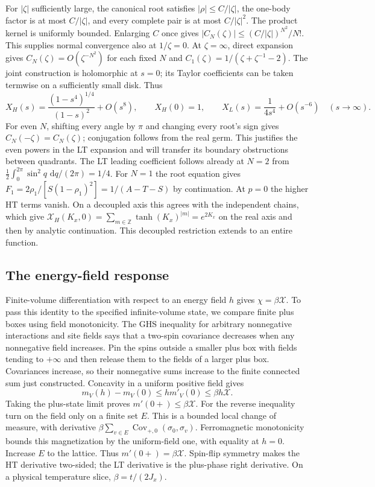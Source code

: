 \documentclass[11pt]{article}
\numberwithin{equation}{section}
\theoremstyle{definition}
\newcommand{\Z}{\mathbb Z}
\newcommand{\dd}{\,\mathrm d}
\begin{document}
For $|\zeta|$ sufficiently large, the canonical root satisfies
$|\rho|\le C/|\zeta|$, the one-body factor is at most
$C/|\zeta|$, and every complete pair is at most $C/|\zeta|^2$.
The product kernel is uniformly bounded. Enlarging $C$ once gives
$|C_N(\zeta)|\le (C/|\zeta|)^{N^2}/N!$.
This supplies normal convergence also at $1/\zeta=0$.
At $\zeta=\infty$, direct expansion gives
$C_N(\zeta)=O(\zeta^{-N^2})$ for each fixed $N$ and
$C_1(\zeta)=1/(\zeta+\zeta^{-1}-2)$.
The joint construction is holomorphic at $s=0$; its Taylor
coefficients can be taken termwise on a sufficiently small disk.
Thus
\[
 X_H(s)=\frac{(1-s^4)^{1/4}}{(1-s)^2}+O(s^8),\qquad
 X_H(0)=1,\qquad
 X_L(s)=\frac1{4s^4}+O(s^{-6})\quad(s\to\infty).
\]
For even $N$, shifting every angle by $\pi$ and changing every
root's sign gives $C_N(-\zeta)=C_N(\zeta)$; conjugation follows
from the real germ. This justifies the even powers in the LT
expansion and will transfer its boundary obstructions between
quadrants. The LT leading coefficient follows already at $N=2$ from
$\tfrac12\int_0^{2\pi}\sin^2q\,\dd q/(2\pi)=1/4$.
For $N=1$ the root equation gives
$F_1=2\rho_1/[S(1-\rho_1)^2]=1/(A-T-S)$ by continuation. At $p=0$ the higher HT
terms vanish. On a decoupled axis this agrees with the independent
chains, which give
$\mathcal X_H(K_x,0)=\sum_{m\in\Z}\tanh(K_x)^{|m|}
=e^{2K_x}$ on the real axis and then by analytic continuation.
This decoupled restriction extends to an entire function.

\subsection{The energy-field response}
Finite-volume differentiation with respect to an energy field $h$
gives $\chi=\beta\mathcal X$. To pass this identity to the
specified infinite-volume state, we compare finite plus boxes using
field monotonicity. The GHS inequality for arbitrary
nonnegative interactions and site fields \cite[Theorem 1.5]{CGN}
says that a two-spin covariance decreases when any nonnegative
field increases. Pin the spins outside a smaller plus box with
fields tending to $+\infty$ and then release them to the fields
of a larger plus box. Covariances increase, so their nonnegative
sums increase to the finite connected sum just constructed.
Concavity in a uniform positive field gives
\[
 m_V(h)-m_V(0)\le h m'_V(0)\le\beta h\mathcal X.
\]
Taking the plus-state limit proves $m'(0+)\le\beta\mathcal X$.
For the reverse inequality turn on the field only on a finite set
$E$. This is a bounded local change of measure, with derivative
$\beta\sum_{v\in E}\operatorname{Cov}_{+,0}(\sigma_0,\sigma_v)$.
Ferromagnetic monotonicity bounds this magnetization by the
uniform-field one, with equality at $h=0$. Increase $E$ to the
lattice. Thus $m'(0+)=\beta\mathcal X$. Spin-flip symmetry makes
the HT derivative two-sided; the LT derivative is the plus-phase
right derivative. On a physical temperature slice, $\beta=t/(2J_x)$.
\end{document}
